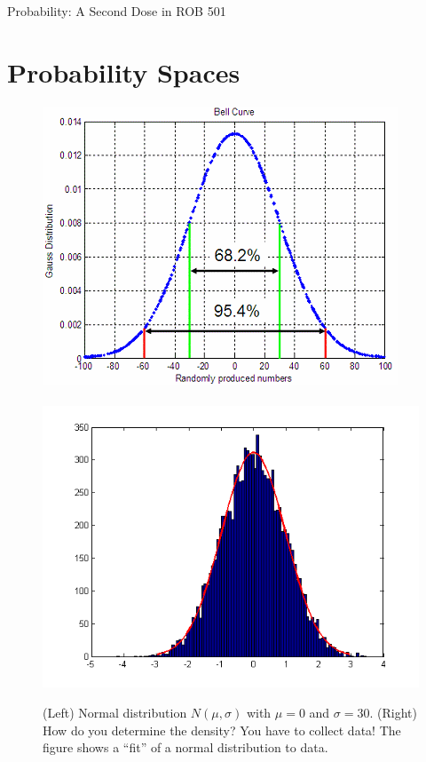 \documentclass[letterpaper]{article}
\begin{document}
\baselineskip=48pt  %

\setlength{\parskip}{.2in}
\setlength{\itemsep}{.3in}

\pagestyle{plain}

{\Large \bf
\begin{center}
Probability: A Second Dose in ROB 501
\end{center}
}

\Large

    \section{Probability Spaces}

    \begin{figure}[h]
	\centering
	\includegraphics[width=0.35\columnwidth]{Graphics/gauss-distribution-002.png}~~~~~~ ~~~~
	\includegraphics[width=0.35\columnwidth]{Graphics/O3lCB.png}
	\caption{(Left) Normal distribution $N(\mu, \sigma)$ with $\mu=0$ and $\sigma=30$. (Right) How do you determine the density? You have to collect data! The figure shows a ``fit'' of a normal distribution to data.}
\end{figure}
\end{document}
